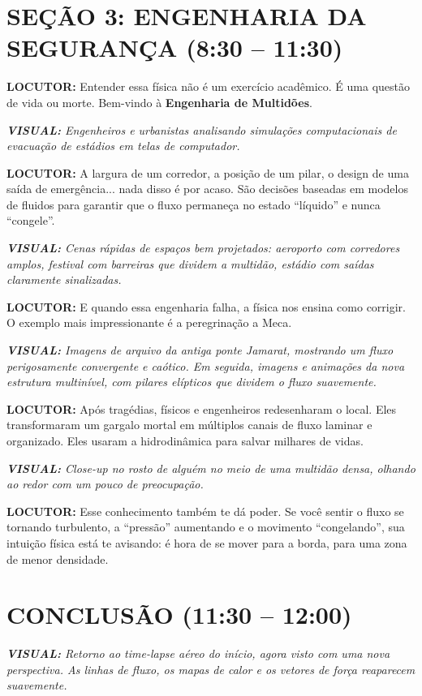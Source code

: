 \documentclass[a4paper, 10pt]{article}
\newcommand{\locutor}[1]{%
	\par\noindent\textcolor{locutorgray}{\textbf{LOCUTOR:} #1}%
}
\newcommand{\visual}[1]{%
	\par\noindent\textcolor{visualblue}{\textit{\textbf{VISUAL:} #1}}%
}
\begin{document}
	\section*{SEÇÃO 3: ENGENHARIA DA SEGURANÇA (8:30 -- 11:30)}
	
	\locutor{Entender essa física não é um exercício acadêmico. É uma questão de vida ou morte. Bem-vindo à \textbf{Engenharia de Multidões}.}
	
	\visual{Engenheiros e urbanistas analisando simulações computacionais de evacuação de estádios em telas de computador.}
	
	\locutor{A largura de um corredor, a posição de um pilar, o design de uma saída de emergência... nada disso é por acaso. São decisões baseadas em modelos de fluidos para garantir que o fluxo permaneça no estado ``líquido'' e nunca ``congele''.}
	
	\visual{Cenas rápidas de espaços bem projetados: aeroporto com corredores amplos, festival com barreiras que dividem a multidão, estádio com saídas claramente sinalizadas.}
	
	\locutor{E quando essa engenharia falha, a física nos ensina como corrigir. O exemplo mais impressionante é a peregrinação a Meca.}
	
	\visual{Imagens de arquivo da antiga ponte Jamarat, mostrando um fluxo perigosamente convergente e caótico. Em seguida, imagens e animações da nova estrutura multinível, com pilares elípticos que dividem o fluxo suavemente.}
	
	\locutor{Após tragédias, físicos e engenheiros redesenharam o local. Eles transformaram um gargalo mortal em múltiplos canais de fluxo laminar e organizado. Eles usaram a hidrodinâmica para salvar milhares de vidas.}
	
	\visual{Close-up no rosto de alguém no meio de uma multidão densa, olhando ao redor com um pouco de preocupação.}
	
	\locutor{Esse conhecimento também te dá poder. Se você sentir o fluxo se tornando turbulento, a ``pressão'' aumentando e o movimento ``congelando'', sua intuição física está te avisando: é hora de se mover para a borda, para uma zona de menor densidade.}
	
	\section*{CONCLUSÃO (11:30 -- 12:00)}
	
	\visual{Retorno ao time-lapse aéreo do início, agora visto com uma nova perspectiva. As linhas de fluxo, os mapas de calor e os vetores de força reaparecem suavemente.}
	
\end{document}
